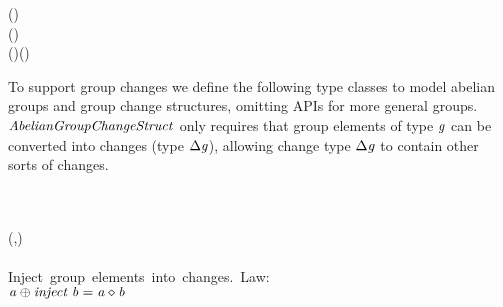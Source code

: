 \begin{hscode}\SaveRestoreHook
{}%
%
\>[B]{}\mathrel{:\mkern-1mu:}\;\Rightarrow{}\;\to \Delta (\;)\to \Delta {}\<[E]%
\\
\>[B]{}\;\;(\;)\mathrel{=}\;\<[E]%
\\
\>[B]{}\;(\;\;)\;\mathrel{=}\;(\;){}\<[E]%
\\
\>[B]{}\;\;\mathrel{=}\;\<[E]%
\ColumnHook
\end{hscode}\resethooks

To support group changes we define the following type classes to model abelian groups
and group change structures, omitting APIs for more general groups.
\ensuremath{\Conid{AbelianGroupChangeStruct}} only requires that group
elements of type \ensuremath{\Varid{g}} can be converted into changes (type \ensuremath{\Delta \Varid{g}}), allowing
change type \ensuremath{\Delta \Varid{g}} to contain other sorts of changes.
\begin{hscode}\SaveRestoreHook
{}%
%
%
%
\>[B]{}\;\;\Rightarrow{}\;\;\<[E]%
\\
\>[B]{}\<[3]%
\>[3]{}\mathrel{:\mkern-1mu:}\to {}\<[E]%
\\
\>[B]{}\;({}\<[10]%
\>[10]{}\;,\;)\Rightarrow{}\<[E]%
\\
\>[10]{}\;\;\<[E]%
\\
\>[B]{}\mbox{\onelinecomment  Inject group elements into changes. Law:}{}\<[E]%
\\
\>[B]{}\mbox{\onelinecomment  \ensuremath{\Varid{a}\oplus \Varid{inject}\;\Varid{b}\mathrel{=}\Varid{a} \diamond \Varid{b}}}{}\<[E]%
\\
\>[B]{}\<[3]%
\>[3]{}\mathrel{:\mkern-1mu:}\to \Delta {}\<[E]%
\ColumnHook
\end{hscode}\resethooks

